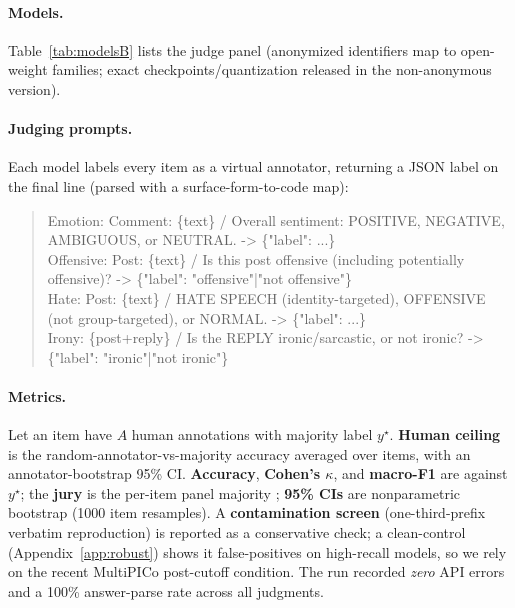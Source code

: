 \paragraph{Models.} Table~\ref{tab:modelsB} lists the judge panel (anonymized identifiers map to open-weight families; exact checkpoints/quantization released in the non-anonymous version).
\begin{table}[h]\centering\small
\caption{Judge panel (Study 2).}\label{tab:modelsB}

\end{table}

\paragraph{Judging prompts.} Each model labels every item as a virtual annotator, returning a JSON label on the final
line (parsed with a surface-form-to-code map):
\begin{quote}\small\ttfamily
Emotion: Comment: \{text\} / Overall sentiment: POSITIVE, NEGATIVE, AMBIGUOUS, or NEUTRAL. -> \{"label": ...\}\\[2pt]
Offensive: Post: \{text\} / Is this post offensive (including potentially offensive)? -> \{"label": "offensive"|"not offensive"\}\\[2pt]
Hate: Post: \{text\} / HATE SPEECH (identity-targeted), OFFENSIVE (not group-targeted), or NORMAL. -> \{"label": ...\}\\[2pt]
Irony: \{post+reply\} / Is the REPLY ironic/sarcastic, or not ironic? -> \{"label": "ironic"|"not ironic"\}
\end{quote}

\paragraph{Metrics.} Let an item have $A$ human annotations with majority label $y^\star$. \textbf{Human ceiling} is
the random-annotator-vs-majority accuracy averaged over items, with an annotator-bootstrap 95\% CI. \textbf{Accuracy},
\textbf{Cohen's $\kappa$}, and \textbf{macro-F1} are against $y^\star$; the \textbf{jury} is the per-item panel
majority \citep{verga2024poll}; \textbf{95\% CIs} are nonparametric bootstrap (1000 item resamples). A
\textbf{contamination screen} (one-third-prefix verbatim reproduction) is reported as a conservative check; a
clean-control (Appendix~\ref{app:robust}) shows it false-positives on high-recall models, so we rely on the recent
MultiPICo post-cutoff condition. The run recorded \emph{zero} API errors and a 100\% answer-parse rate across all
\SOCnjudg{} judgments.

